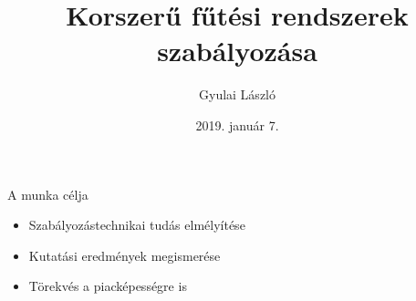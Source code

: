 \documentclass[14pt,handout]{beamer}
\title{Korszerű fűtési rendszerek szabályozása}
\author{Gyulai László}
\date{2019. január 7.}
\begin{document}
	
	\frame{\titlepage}
%
%        	        	
%

\begin{frame}{A munka célja}
\begin{itemize}
	\setlength{\itemsep}{6pt}
	\item Szabályozástechnikai tudás elmélyítése \pause
	\item Kutatási eredmények megismerése \pause
	\item Törekvés a piacképességre is	
\end{itemize}
\end{frame}
\end{document}
